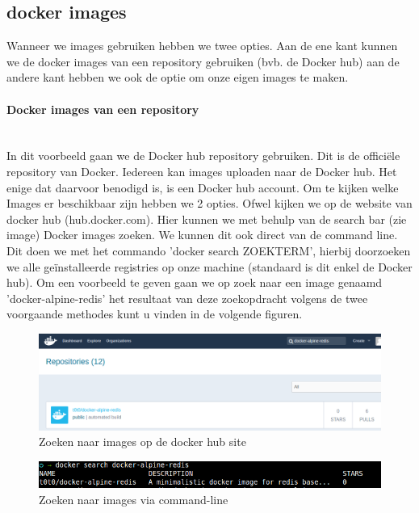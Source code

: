 \subsection{docker images}

Wanneer we images gebruiken hebben we twee opties. Aan de ene kant kunnen we de docker images van een repository gebruiken (bvb. de Docker hub) aan de andere kant hebben we ook de optie om onze eigen images te maken. 

\paragraph{Docker images van een repository}~\\

In dit voorbeeld gaan we de Docker hub repository gebruiken. Dit is de officiële repository van Docker. Iedereen kan images uploaden naar de Docker hub. Het enige dat daarvoor benodigd is, is een Docker hub account. Om te kijken welke Images er beschikbaar zijn hebben we 2 opties. Ofwel kijken we op de website van docker hub (hub.docker.com). Hier kunnen we met behulp van de search bar (zie image) Docker images zoeken. We kunnen dit ook direct van de command line. Dit doen we met het commando 'docker search ZOEKTERM', hierbij doorzoeken we alle geïnstalleerde registries op onze machine (standaard is dit enkel de Docker hub). Om een voorbeeld te geven gaan we op zoek naar een image genaamd 'docker-alpine-redis' het resultaat van deze zoekopdracht volgens de twee voorgaande methodes kunt u vinden in de volgende figuren.
\begin{figure}[!ht]
	\centering
	\includegraphics[scale=0.315]{img/dockerSearchSite.png}
	\caption{Zoeken naar images op de docker hub site}
\end{figure}

\begin{figure}[!ht]
	\centering
	\includegraphics[scale=0.55]{img/dockerSearchCommand.png}
	\caption{Zoeken naar images via command-line}
\end{figure}	




